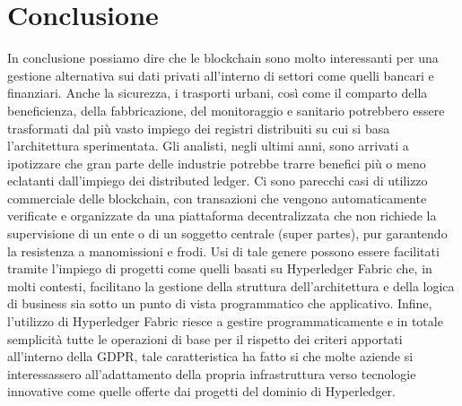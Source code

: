 \chapter{Conclusione}
In conclusione possiamo dire che le blockchain sono molto interessanti per una gestione alternativa sui dati privati all'interno di settori come quelli bancari e finanziari. Anche la sicurezza, i trasporti urbani, così come il comparto della beneficienza, della fabbricazione, del monitoraggio e sanitario potrebbero essere trasformati dal più vasto impiego dei registri distribuiti su cui si basa l'architettura sperimentata.
Gli analisti, negli ultimi anni, sono arrivati a ipotizzare che gran parte delle industrie potrebbe trarre benefici più o meno eclatanti dall’impiego dei distributed ledger. Ci sono parecchi casi di utilizzo commerciale delle blockchain, con transazioni che vengono automaticamente verificate e organizzate da una piattaforma decentralizzata che non richiede la supervisione di un ente o di un soggetto centrale (super partes), pur garantendo la resistenza a manomissioni e frodi. Usi di tale genere possono essere facilitati tramite l'impiego di progetti come quelli basati su Hyperledger Fabric che, in molti contesti, facilitano la gestione della struttura dell'architettura e della logica di business sia sotto un punto di vista programmatico che applicativo. Infine, l'utilizzo di Hyperledger Fabric riesce a gestire programmaticamente e in totale semplicità tutte le operazioni di base per il rispetto dei criteri apportati all'interno della GDPR, tale caratteristica ha fatto si che molte aziende si interessassero all'adattamento della propria infrastruttura verso tecnologie innovative come quelle offerte dai progetti del dominio di Hyperledger.
\newpage